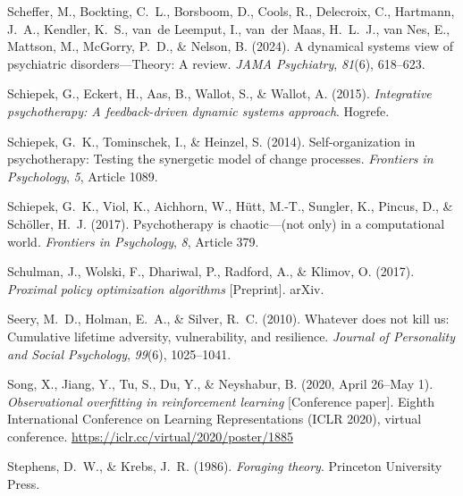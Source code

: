 \documentclass[12pt,fleqn]{article}
\begin{document}
\begin{thebibliography}{}
  Scheffer, M., Bockting, C.~L., Borsboom, D., Cools, R., Delecroix, C., Hartmann, J.~A., Kendler, K.~S., van~de Leemput, I., van~der Maas, H.~L.~J., van Nes, E., Mattson, M., McGorry, P.~D., \& Nelson, B. (2024).
  A dynamical systems view of psychiatric disorders---Theory: A review.
  \emph{JAMA Psychiatry}, \emph{81}(6), 618--623.

  Schiepek, G., Eckert, H., Aas, B., Wallot, S., \& Wallot, A. (2015).
  \emph{Integrative psychotherapy: A feedback-driven dynamic systems approach}.
  Hogrefe.

  Schiepek, G.~K., Tominschek, I., \& Heinzel, S. (2014).
  Self-organization in psychotherapy: Testing the synergetic model of change processes.
  \emph{Frontiers in Psychology}, \emph{5}, Article 1089.

  Schiepek, G.~K., Viol, K., Aichhorn, W., H\"utt, M.-T., Sungler, K., Pincus, D., \& Sch\"oller, H.~J. (2017).
  Psychotherapy is chaotic---(not only) in a computational world.
  \emph{Frontiers in Psychology}, \emph{8}, Article 379.

  Schulman, J., Wolski, F., Dhariwal, P., Radford, A., \& Klimov, O. (2017).
  \emph{Proximal policy optimization algorithms} [Preprint].
  arXiv.

  Seery, M.~D., Holman, E.~A., \& Silver, R.~C. (2010).
  Whatever does not kill us: Cumulative lifetime adversity, vulnerability, and resilience.
  \emph{Journal of Personality and Social Psychology}, \emph{99}(6), 1025--1041.

  Song, X., Jiang, Y., Tu, S., Du, Y., \& Neyshabur, B. (2020, April 26--May 1).
  \emph{Observational overfitting in reinforcement learning} [Conference paper].
  Eighth International Conference on Learning Representations (ICLR 2020), virtual conference.
  \url{https://iclr.cc/virtual/2020/poster/1885}

  Stephens, D.~W., \& Krebs, J.~R. (1986).
  \emph{Foraging theory}.
  Princeton University Press.


\end{thebibliography}
\end{document}

